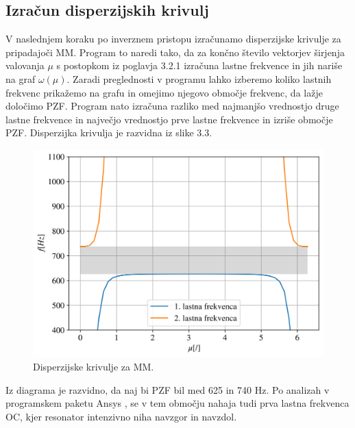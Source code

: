 \documentclass[12pt]{report}
\begin{document}
\subsection{Izračun disperzijskih krivulj}
V naslednjem koraku po inverznem pristopu izračunamo disperzijske krivulje za pripadajoči \ac{MM}. Program to naredi tako, da za končno število vektorjev širjenja valovanja $\mu$ s postopkom iz poglavja 3.2.1 izračuna
lastne frekvence in jih nariše na graf $\omega(\mu)$. Zaradi preglednosti v programu lahko izberemo koliko lastnih frekvenc prikažemo na grafu in omejimo njegovo območje frekvenc, da lažje določimo \ac{PZF}.
Program nato izračuna razliko med najmanjšo vrednostjo druge lastne frekvence in največjo vrednostjo prve lastne frekvence in izriše območje \ac{PZF}. Disperzijka krivulja je razvidna iz slike 3.3.
\begin{figure}[H]
  \centering
  \includegraphics[scale=0.8]{Images/dispersion.png}
  \caption{Disperzijske krivulje za \ac{MM}.}
\end{figure}
Iz diagrama je razvidno, da naj bi \ac{PZF} bil med 625 in 740 Hz. Po analizah v programskem paketu Ansys \cite{ansys}, se v tem območju nahaja tudi prva lastna frekvenca
\ac{OC}, kjer resonator intenzivno niha navzgor in navzdol.
\end{document}
